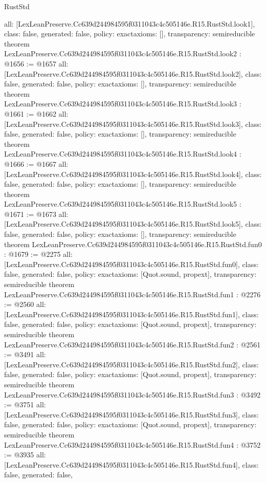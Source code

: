 \begin{lexlean}{RustStd}
\begin{coremodule}
{  all: [LexLeanPreserve.Cc639d244984595f0311043c4c505146e.R15.RustStd.look1],
  class: false,
  generated: false,
  policy: exact{axioms: []},
  transparency: semireducible
}
theorem LexLeanPreserve.Cc639d244984595f0311043c4c505146e.R15.RustStd.look2 : @1656 := @1657 {
  all: [LexLeanPreserve.Cc639d244984595f0311043c4c505146e.R15.RustStd.look2],
  class: false,
  generated: false,
  policy: exact{axioms: []},
  transparency: semireducible
}
theorem LexLeanPreserve.Cc639d244984595f0311043c4c505146e.R15.RustStd.look3 : @1661 := @1662 {
  all: [LexLeanPreserve.Cc639d244984595f0311043c4c505146e.R15.RustStd.look3],
  class: false,
  generated: false,
  policy: exact{axioms: []},
  transparency: semireducible
}
theorem LexLeanPreserve.Cc639d244984595f0311043c4c505146e.R15.RustStd.look4 : @1666 := @1667 {
  all: [LexLeanPreserve.Cc639d244984595f0311043c4c505146e.R15.RustStd.look4],
  class: false,
  generated: false,
  policy: exact{axioms: []},
  transparency: semireducible
}
theorem LexLeanPreserve.Cc639d244984595f0311043c4c505146e.R15.RustStd.look5 : @1671 := @1673 {
  all: [LexLeanPreserve.Cc639d244984595f0311043c4c505146e.R15.RustStd.look5],
  class: false,
  generated: false,
  policy: exact{axioms: []},
  transparency: semireducible
}
theorem LexLeanPreserve.Cc639d244984595f0311043c4c505146e.R15.RustStd.fun0 : @1679 := @2275 {
  all: [LexLeanPreserve.Cc639d244984595f0311043c4c505146e.R15.RustStd.fun0],
  class: false,
  generated: false,
  policy: exact{axioms: [Quot.sound, propext]},
  transparency: semireducible
}
theorem LexLeanPreserve.Cc639d244984595f0311043c4c505146e.R15.RustStd.fun1 : @2276 := @2560 {
  all: [LexLeanPreserve.Cc639d244984595f0311043c4c505146e.R15.RustStd.fun1],
  class: false,
  generated: false,
  policy: exact{axioms: [Quot.sound, propext]},
  transparency: semireducible
}
theorem LexLeanPreserve.Cc639d244984595f0311043c4c505146e.R15.RustStd.fun2 : @2561 := @3491 {
  all: [LexLeanPreserve.Cc639d244984595f0311043c4c505146e.R15.RustStd.fun2],
  class: false,
  generated: false,
  policy: exact{axioms: [Quot.sound, propext]},
  transparency: semireducible
}
theorem LexLeanPreserve.Cc639d244984595f0311043c4c505146e.R15.RustStd.fun3 : @3492 := @3751 {
  all: [LexLeanPreserve.Cc639d244984595f0311043c4c505146e.R15.RustStd.fun3],
  class: false,
  generated: false,
  policy: exact{axioms: [Quot.sound, propext]},
  transparency: semireducible
}
theorem LexLeanPreserve.Cc639d244984595f0311043c4c505146e.R15.RustStd.fun4 : @3752 := @3935 {
  all: [LexLeanPreserve.Cc639d244984595f0311043c4c505146e.R15.RustStd.fun4],
  class: false,
  generated: false,
}
\end{coremodule}
\end{lexlean}
